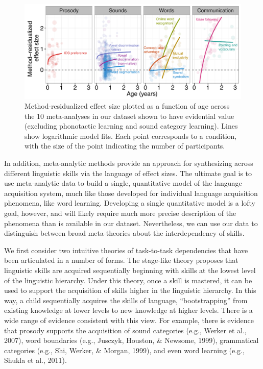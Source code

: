 \documentclass[9pt,twocolumn,twoside,lineno]{pnas-new}
\begin{document}
\begin{figure}[tbhp]
\centering
\includegraphics[width=17.8cm]{figs/fig3_lab.pdf}
\caption{Method-residualized effect size plotted as a function of age
across the 10 meta-analyses in our dataset shown to have evidential
value (excluding phonotactic learning and sound category learning).
Lines show logarithmic model fits. Each point corresponds to a
condition, with the size of the point indicating the number of
participants.}
\end{figure}



In addition, meta-analytic methods provide an approach for synthesizing
across different linguistic skills via the language of effect sizes. The
ultimate goal is to use meta-analytic data to build a single,
quantitative model of the language acquisition system, much like those
developed for individual language acquisition phenomena, like word
learning. Developing a single quantitative model is a lofty goal,
however, and will likely require much more precise description of the
phenomena than is available in our dataset. Nevertheless, we can use our
data to distinguish between broad meta-theories about the
interdependency of skills.

We first consider two intuitive theories of task-to-task dependencies
that have been articulated in a number of forms. The stage-like theory
proposes that linguistic skills are acquired sequentially beginning with
skills at the lowest level of the linguistic hierarchy. Under this
theory, once a skill is mastered, it can be used to support the
acquisition of skills higher in the linguistic hierarchy. In this way, a
child sequentially acquires the skills of language,
\enquote{bootstrapping} from existing knowledge at lower levels to new
knowledge at higher levels. There is a wide range of evidence consistent
with this view. For example, there is evidence that prosody supports the
acquisition of sound categories (e.g., Werker et al., 2007), word
boundaries (e.g., Jusczyk, Houston, \& Newsome, 1999), grammatical
categories (e.g., Shi, Werker, \& Morgan, 1999), and even word learning
(e.g., Shukla et al., 2011).
\end{document}
